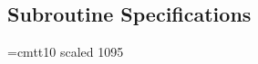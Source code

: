 \subsection{Subroutine Specifications}











\newlength{\sstbannerlength}
\newlength{\sstcaptionlength}

\font\ssttt=cmtt10 scaled 1095

\newcommand{\sstroutine}[3]{
   \goodbreak
   \rule{\textwidth}{0.5mm}
   \vspace{-7ex}
   \newline
   \settowidth{\sstbannerlength}{{\Large {\bf #1}}}
   \setlength{\sstcaptionlength}{\textwidth}
   \addtolength{\sstbannerlength}{0.5em}
   \addtolength{\sstcaptionlength}{-2.0\sstbannerlength}
   \addtolength{\sstcaptionlength}{-4.45pt}
   \parbox[t]{\sstbannerlength}{\flushleft{\Large {\bf #1}}}
   \parbox[t]{\sstcaptionlength}{\center{\Large #2}}
   \parbox[t]{\sstbannerlength}{\flushright{\Large {\bf #1}}}
   \begin{description}
      #3
   \end{description}
}

